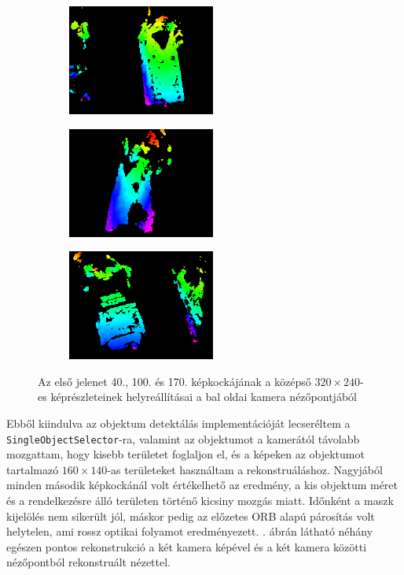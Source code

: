 \begin{figure}[tbh]
\centering
\begin{subfigure}[b]{.32\linewidth}
	\centering
	\includegraphics[width=137pt]{figures/vis_93_320.png}
  \end{subfigure}
\begin{subfigure}[b]{.32\linewidth}
	\centering
	\includegraphics[width=137pt]{figures/vis_152_320.png}
  \end{subfigure}
\begin{subfigure}[b]{.32\linewidth}
	\centering
	\includegraphics[width=137pt]{figures/vis_223_320.png}
  \end{subfigure}
\caption{Az első jelenet 40., 100. és 170. képkockájának a középső $320\times 240$-es képrészleteinek helyreállításai a bal oldai kamera nézőpontjából \label{fig:cut_320_240}}
\end{figure}

Ebből kiindulva az objektum detektálás implementációját lecseréltem a \texttt{SingleObjectSelector}-ra, valamint az objektumot a kamerától távolabb mozgattam, hogy kisebb területet foglaljon el, és a képeken az objektumot tartalmazó $160\times 140$-as területeket használtam a rekonstruáláshoz. Nagyjából minden második képkockánál volt értékelhető az eredmény, a kis objektum méret és a rendelkezésre álló területen történő kicsiny mozgás miatt. Időnként a maszk kijelölés nem sikerült jól, máskor pedig az előzetes ORB alapú párosítás volt helytelen, ami rossz optikai folyamot eredményezett. . ábrán látható néhány egészen pontos rekonstrukció a két kamera képével és a két kamera közötti nézőpontból rekonstruált nézettel.

